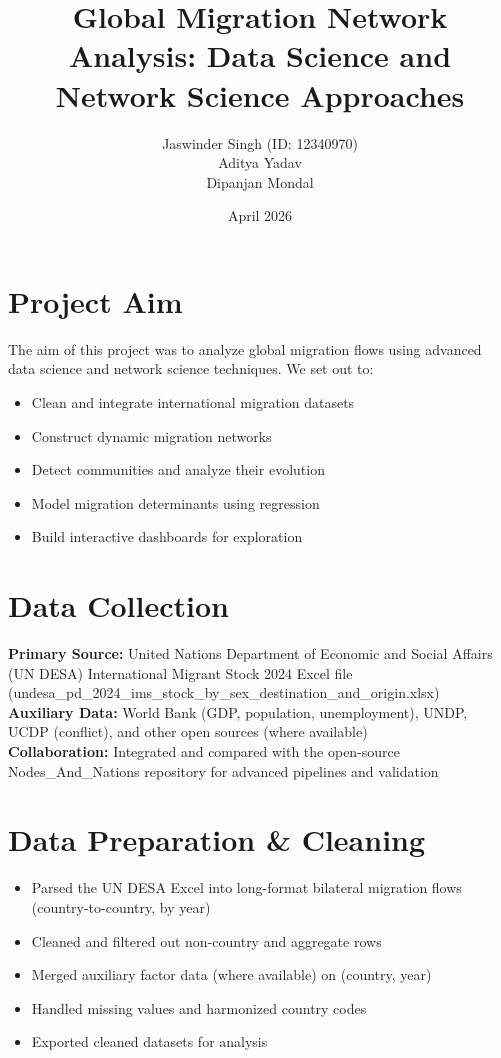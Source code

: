 \documentclass[12pt]{article}
\title{Global Migration Network Analysis: Data Science and Network Science Approaches}
\author{Jaswinder Singh (ID: 12340970) \\ Aditya Yadav \\ Dipanjan Mondal}
\date{April 2026}
\begin{document}
\maketitle

\section{Project Aim}
The aim of this project was to analyze global migration flows using advanced data science and network science techniques. We set out to:
\begin{itemize}
  \item Clean and integrate international migration datasets
  \item Construct dynamic migration networks
  \item Detect communities and analyze their evolution
  \item Model migration determinants using regression
  \item Build interactive dashboards for exploration
\end{itemize}

\section{Data Collection}
\textbf{Primary Source:} United Nations Department of Economic and Social Affairs (UN DESA) International Migrant Stock 2024 Excel file (undesa\_pd\_2024\_ims\_stock\_by\_sex\_destination\_and\_origin.xlsx)\\
\textbf{Auxiliary Data:} World Bank (GDP, population, unemployment), UNDP, UCDP (conflict), and other open sources (where available)\\
\textbf{Collaboration:} Integrated and compared with the open-source Nodes\_And\_Nations repository for advanced pipelines and validation

\section{Data Preparation \& Cleaning}
\begin{itemize}
  \item Parsed the UN DESA Excel into long-format bilateral migration flows (country-to-country, by year)
  \item Cleaned and filtered out non-country and aggregate rows
  \item Merged auxiliary factor data (where available) on (country, year)
  \item Handled missing values and harmonized country codes
  \item Exported cleaned datasets for analysis
\end{itemize}
\end{document}
